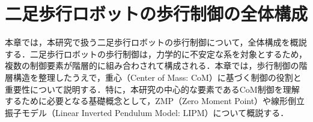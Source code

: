\chapter{二足歩行ロボットの歩行制御の全体構成}
本章では，本研究で扱う二足歩行ロボットの歩行制御について，全体構成を概説する．二足歩行ロボットの歩行制御は，力学的に不安定な系を対象とするため，複数の制御要素が階層的に組み合わされて構成される．本章では，歩行制御の階層構造を整理したうえで，重心（Center of Mass: CoM）に基づく制御の役割と重要性について説明する．特に，本研究の中心的な要素であるCoM制御を理解するために必要となる基礎概念として，ZMP（Zero Moment Point）や線形倒立振子モデル（Linear Inverted Pendulum Model: LIPM）について概説する．
\label{chap:control-overview}













